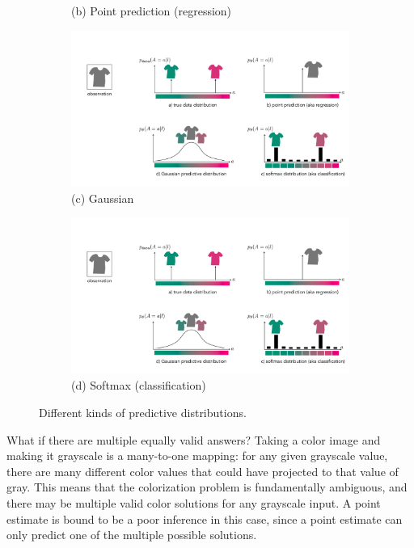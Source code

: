 \begin{figure}
{\begin{minipage}{0.84\linewidth}
\begin{subfigure}[b]{0.5\textwidth}
    \caption*{(b) Point prediction (regression)}
    \vspace{0.4cm}
    \end{subfigure}
    \hfill
    \begin{subfigure}[b]{0.5\textwidth}
        \includegraphics[width=1.0\linewidth]{./figures/conditional_generative_models/cgen_tshirts_gauss.pdf}
    \caption*{(c) Gaussian}
    \end{subfigure}
    \hfill
    \begin{subfigure}[b]{0.5\textwidth}
        \includegraphics[width=1.0\linewidth]{./figures/conditional_generative_models/cgen_tshirts_class.pdf}
    \caption*{(d) Softmax (classification)}
    \end{subfigure}
    \hfill
\end{minipage}
}
\caption{Different kinds of predictive distributions.}
\label{fig:conditional_generative_models:tshirts}
\end{figure}

What if there are multiple equally valid answers? Taking a color image and making it grayscale is a many-to-one mapping: for any given grayscale value, there are many different color values that could have projected to that value of gray. This means that the colorization problem is fundamentally ambiguous, and there may be multiple valid color solutions for any grayscale input. A point estimate is bound to be a poor inference in this case, since a point estimate can only predict one of the multiple possible solutions.

